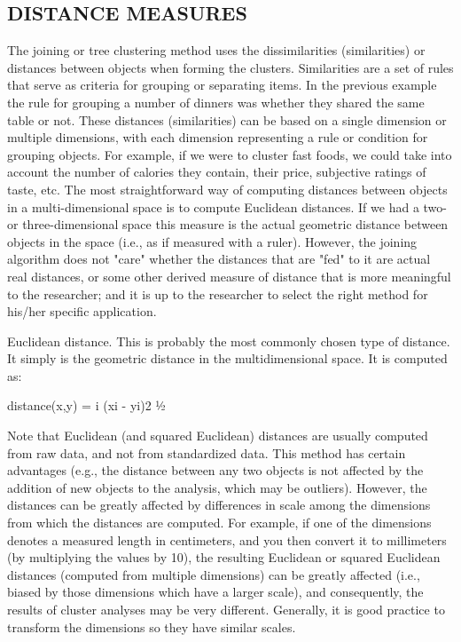 \subsection*{DISTANCE MEASURES}

The joining or tree clustering method uses the dissimilarities (similarities) or distances between objects when forming the clusters. Similarities are a set of rules that serve as criteria for grouping or separating items. In the previous example the rule for grouping a number of dinners was whether they shared the same table or not. These distances (similarities) can be based on a single dimension or multiple dimensions, with each dimension representing a rule or condition for grouping objects. For example, if we were to cluster fast foods, we could take into account the number of calories they contain, their price, subjective ratings of taste, etc. The most straightforward way of computing distances between objects in a multi-dimensional space is to compute Euclidean distances. If we had a two- or three-dimensional space this measure is the actual geometric distance between objects in the space (i.e., as if measured with a ruler). However, the joining algorithm does not "care" whether the distances that are "fed" to it are actual real distances, or some other derived measure of distance that is more meaningful to the researcher; and it is up to the researcher to select the right method for his/her specific application.

Euclidean distance. This is probably the most commonly chosen type of distance. It simply is the geometric distance in the multidimensional space. It is computed as:

distance(x,y) = {i (xi - yi)2 }½

Note that Euclidean (and squared Euclidean) distances are usually computed from raw data, and not from standardized data. This method has certain advantages (e.g., the distance between any two objects is not affected by the addition of new objects to the analysis, which may be outliers). However, the distances can be greatly affected by differences in scale among the dimensions from which the distances are computed. For example, if one of the dimensions denotes a measured length in centimeters, and you then convert it to millimeters (by multiplying the values by 10), the resulting Euclidean or squared Euclidean distances (computed from multiple dimensions) can be greatly affected (i.e., biased by those dimensions which have a larger scale), and consequently, the results of cluster analyses may be very different. Generally, it is good practice to transform the dimensions so they have similar scales.

